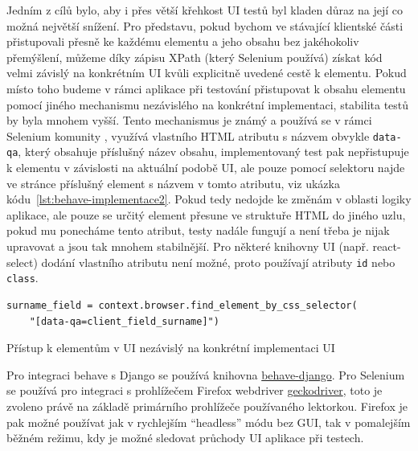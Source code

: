 Jedním z cílů bylo, aby i přes větší křehkost UI testů byl kladen důraz na její co možná největší snížení. Pro představu, pokud bychom ve stávající klientské části přistupovali přesně ke každému elementu a jeho obsahu bez jakéhokoliv přemýšlení, můžeme díky zápisu XPath (který Selenium používá) získat kód velmi závislý na konkrétním UI kvůli explicitně uvedené cestě k elementu. Pokud místo toho budeme v rámci aplikace při testování přistupovat k obsahu elementu pomocí jiného mechanismu nezávislého na konkrétní implementaci, stabilita testů by byla mnohem vyšší. Tento mechanismus je známý a používá se v rámci Selenium komunity \cite{dataqa}, využívá vlastního HTML atributu s názvem obvykle \verb|data-qa|, který obsahuje příslušný název obsahu, implementovaný test pak nepřistupuje k elementu v závislosti na aktuální podobě UI, ale pouze pomocí selektoru najde ve stránce příslušný element s názvem v tomto atributu, viz ukázka kódu~\ref{lst:behave-implementace2}. Pokud tedy nedojde ke změnám v oblasti logiky aplikace, ale pouze se určitý element přesune ve struktuře HTML do jiného uzlu, pokud mu ponecháme tento atribut, testy nadále fungují a není třeba je nijak upravovat a jsou tak mnohem stabilnější. Pro některé knihovny UI (např. react-select) dodání vlastního atributu není možné, proto používají atributy \verb|id| nebo \verb|class|.

\begin{listing}[ht]
	\begin{verbatim}
surname_field = context.browser.find_element_by_css_selector(
    "[data-qa=client_field_surname]")
	\end{verbatim}
	\caption{Přístup k elementům v UI nezávislý na konkrétní implementaci UI}\label{lst:behave-implementace2}
\end{listing}

Pro integraci behave s Django se používá knihovna \href{https://github.com/behave/behave-django}{behave-django}. Pro Selenium se používá pro integraci s prohlížečem Firefox webdriver \href{https://github.com/mozilla/geckodriver}{geckodriver}, toto je zvoleno právě na základě primárního prohlížeče používaného lektorkou. Firefox je pak možné používat jak v rychlejším \enquote{headless} módu bez GUI, tak v pomalejším běžném režimu, kdy je možné sledovat průchody UI aplikace při testech.

